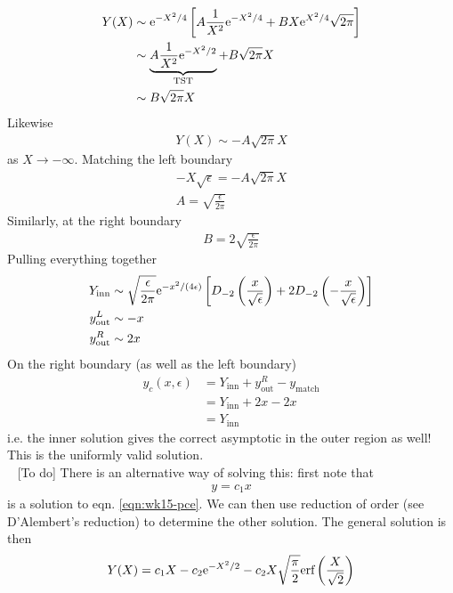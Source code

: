 \begin{align*}
	Y(X) &\sim \mathrm{e}^{-X^2/4} \left[A \frac{1}{X^2} \mathrm{e}^{-X^2/4} + BX \mathrm{e}^{X^2/4} \sqrt{2\pi}\right] \\
	&\sim \underbrace{A \frac{1}{X^2} \mathrm{e}^{-X^2/2}}_\text{TST} + B \sqrt{2\pi} X \\
	& \sim B \sqrt{2\pi} X
\end{align*}
Likewise
\begin{gather*}
	Y(X) \sim -A \sqrt{2\pi} X
\end{gather*}
as $X \rightarrow -\infty$. Matching the left boundary
\begin{gather*}
	-X \sqrt{\epsilon} = -A \sqrt{2\pi} X \\
	A = \sqrt{\frac{\epsilon}{2 \pi}}
\end{gather*}
Similarly, at the right boundary
\begin{gather*}
	B = 2 \sqrt{\frac{\epsilon}{2 \pi}}
\end{gather*}
Pulling everything together
\begin{align*}
	Y_\text{inn} & \sim \sqrt{\frac{\epsilon}{2 \pi}}\mathrm{e}^{-{x^2}/(4\epsilon)} \left[D_{-2}\left(\frac{x}{\sqrt{\epsilon}}\right) + 2 D_{-2}\left(-\frac{x}{\sqrt{\epsilon}}\right)\right] \\
	y^L_\text{out} &\sim -x \\
	y^R_\text{out} &\sim 2x
\end{align*}
On the right boundary (as well as the left boundary)
\begin{align*}
	y_c(x,\epsilon) &= Y_\text{inn} + y_\text{out}^R - y_\text{match} \\
	&=Y_\text{inn} + 2x - 2x \\
	&= Y_\text{inn}
\end{align*}
i.e. the inner solution gives the correct asymptotic in the outer region as well! This is the uniformly valid solution. \\
\ \newline
{\color{red} [To do]} There is an alternative way of solving this: first note that 
\begin{gather*}
	y = c_1 x
\end{gather*} 
is a solution to eqn. \ref{eqn:wk15-pce}. We can then use reduction of order (see D'Alembert's reduction) to determine the other solution. The general solution is then
\begin{gather*}
	Y(X) = c_1 X - c_2 \mathrm{e}^{-X^2/2} - c_2 X \sqrt{\frac{\pi}{2}} \text{erf} \left(\frac{X}{\sqrt{2}}\right)
\end{gather*}
